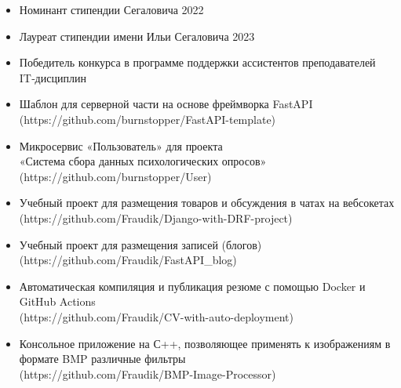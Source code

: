 
\vspace{10pt}


\vspace{10pt}

\begin{itemize}
\item Номинант стипендии  Сегаловича 2022
\item Лауреат стипендии имени Ильи Сегаловича 2023
\item Победитель конкурса в программе поддержки ассистентов преподавателей IT‑дисциплин
\end{itemize}

\vspace{6.2pt}

\begin{itemize}
\item Шаблон для серверной части на основе фреймворка FastAPI \\
(https://github.com/burnstopper/FastAPI-template) \\
\item Микросервис «Пользователь» для проекта \\ «Система сбора данных психологических опросов» \\
(https://github.com/burnstopper/User) \\
\item Учебный проект для размещения товаров и обсуждения в чатах на вебсокетах \\
(https://github.com/Fraudik/Django-with-DRF-project) \\
\item Учебный проект для размещения записей (блогов) \\
(https://github.com/Fraudik/FastAPI\_blog) \\
\item Автоматическая компиляция и публикация резюме с помощью Docker и GitHub Actions \\
(https://github.com/Fraudik/CV-with-auto-deployment) \\
\item  Консольное приложение на С++, позволяющее применять к изображениям в формате BMP различные фильтры \\
(https://github.com/Fraudik/BMP-Image-Processor) \\
\end{itemize}
